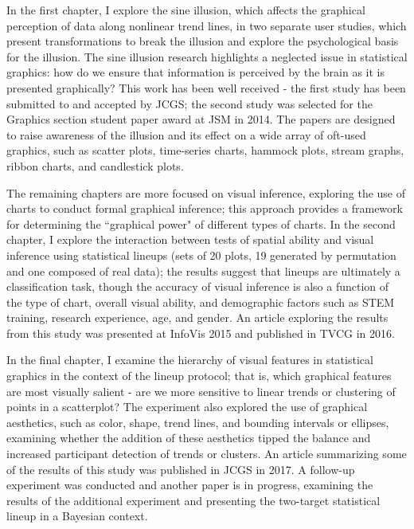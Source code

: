 \documentclass[12pt, letterpaper, sans]{moderncv}
\begin{document}
In the first chapter, I explore the sine illusion, which affects the graphical perception of data along nonlinear trend lines, in two separate user studies, which present transformations to break the illusion and explore the psychological basis for the illusion.
The sine illusion research highlights a neglected issue in statistical graphics: how do we ensure that information is perceived by the brain as it is presented graphically? This work has been well received - the first study has been submitted to and accepted by JCGS; the second study was selected for the Graphics section student paper award at JSM in 2014. The papers are designed to raise awareness of the illusion and its effect on a wide array of oft-used graphics, such as scatter plots, time-series charts, hammock plots, stream graphs, ribbon charts, and candlestick plots.

The remaining chapters are more focused on visual inference, exploring the use of charts to conduct formal graphical inference; this approach provides a framework for determining the ``graphical power" of different types of charts. In the second chapter, I explore the interaction between tests of spatial ability and visual inference using statistical lineups (sets of 20 plots, 19 generated by permutation and one composed of real data); the results suggest that lineups are ultimately a classification task, though the accuracy of visual inference is also a function of the type of chart, overall visual ability, and demographic factors such as STEM training, research experience, age, and gender. An article exploring the results from this study was presented at InfoVis 2015 and published in TVCG in 2016.

In the final chapter, I examine the hierarchy of visual features in statistical graphics in the context of the lineup protocol; that is, which graphical features are most visually salient - are we more sensitive to linear trends or clustering of points in a scatterplot? The experiment also explored the use of graphical aesthetics, such as color, shape, trend lines, and bounding intervals or ellipses, examining whether the addition of these aesthetics tipped the balance and increased participant detection of trends or clusters. An article summarizing some of the results of this study was published in JCGS in 2017. A follow-up experiment was conducted and another paper is in progress, examining the results of the additional experiment and presenting the two-target statistical lineup in a Bayesian context.
\end{document}
